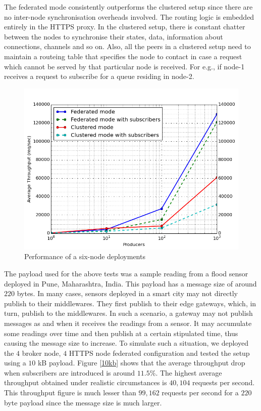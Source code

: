 \documentclass[conference, 10pt]{IEEEtran}
\begin{document}
The federated mode consistently outperforms the clustered setup since there are no inter-node synchronisation overheads involved. The routing logic is embedded entirely in the HTTPS proxy. In the clustered setup, there is constant chatter between the nodes to synchronise their states, data, information about connections, channels and so on. Also, all the peers in a clustered setup need to maintain a routeing table that specifies the node to contact in case a request which cannot be served by that particular node is received. For e.g., if node-1 receives a request to subscribe for a queue residing in node-2.  

\begin{figure}
 \includegraphics[width=\linewidth, height=\linewidth, keepaspectratio]{6-nodes.png}
\caption{Performance of a six-node deployments}
\label{sixnodes}
\end{figure}

The payload used for the above tests was a sample reading from a flood sensor deployed in Pune, Maharashtra, India. This payload has a message size of around$220$ bytes. In many cases, sensors deployed in a smart city may not directly publish to their middlewares. They first publish to their edge gateways, which, in turn, publish to the middlewares. In such a scenario, a gateway may not publish messages as and when it receives the readings from a sensor. It may accumulate some readings over time and then publish at a certain stipulated time, thus causing the message size to increase. To simulate such a situation, we deployed the $4$ broker node, $4$ HTTPS node federated configuration and tested the setup using a $10$ kB payload. Figure \ref{10kb} shows that the average throughput drop when subscribers are introduced is around $11.5\%$. The highest average throughput obtained under realistic circumstances is $40,104$ requests per second. This throughput figure is much lesser than $99,162$ requests per second for a $220$ byte payload since the message size is much larger.
\end{document}
